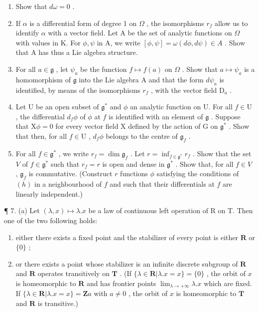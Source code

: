 \begin{enumerate}
\def\labelenumi{(\alph{enumi})}
\setcounter{enumi}{4}
\item
  Show that \(d\omega = 0\) .
\item
  If \(\alpha\) is a differential form of degree 1 on \(\Omega\) , the isomorphisms \(r_f\) allow us to identify \(\alpha\) with a vector field. Let A be the set of analytic functions on \(\Omega\) with values in K. For \(\phi, \psi\) in A, we write \([\phi, \psi] = \omega(d\phi, d\psi) \in A\) . Show that A has thus a Lie algebra structure.
\item
  For all \(a \in \mathfrak{g}\) , let \(\psi_{a}\) be the function \(f \mapsto f(a)\) on \(\Omega\) . Show that \(a \mapsto \psi_{a}\) is a homomorphism of \(\mathfrak{g}\) into the Lie algebra A and that the form \(d\psi_{a}\) is identified, by means of the isomorphisms \(r_{f}\) , with the vector field \(\mathrm{D}_{a}\) .
\item
  Let U be an open subset of \(\mathfrak{g}^*\) and \(\phi\) an analytic function on U. For all \(f\in \mathrm{U}\) , the differential \(d_{f}\phi\) of \(\phi\) at \(f\) is identified with an element of \(\mathfrak{g}\) . Suppose that \(\mathrm{X}\phi = 0\) for every vector field X defined by the action of G on \(\mathfrak{g}^*\) . Show that then, for all \(f\in \mathrm{U}\) , \(d_{f}\phi\) belongs to the centre of \(\mathfrak{g}_f\) .
\item
  For all \(f \in \mathfrak{g}^*\) , we write \(r_f = \dim \mathfrak{g}_f\) . Let \(r = \inf_{f \in \mathfrak{g}^*} r_f\) . Show that the set \(V\) of \(f \in \mathfrak{g}^*\) such that \(r_f = r\) is open and dense in \(\mathfrak{g}^*\) . Show that, for all \(f \in V\) , \(\mathfrak{g}_f\) is commutative. (Construct \(r\) functions \(\phi\) satisfying the conditions of \((h)\) in a neighbourhood of \(f\) and such that their differentials at \(f\) are linearly independent.)
\end{enumerate}

¶ 7. (a) Let \((\lambda, x) \mapsto \lambda.x\) be a law of continuous left operation of R on T. Then one of the two following holds:

\begin{enumerate}
\def\labelenumi{(\arabic{enumi})}
\item
  either there exists a fixed point and the stabilizer of every point is either \(\mathbf{R}\) or \(\{0\}\) ;
\item
  or there exists a point whose stabilizer is an infinite discrete subgroup of \(\mathbf{R}\) and \(\mathbf{R}\) operates transitively on \(\mathbf{T}\) . (If \(\{\lambda \in \mathbf{R}|\lambda .x = x\} = \{0\}\) , the orbit of \(x\) is homeomorphic to \(\mathbf{R}\) and has frontier points \(\lim_{\lambda \to +\infty}\lambda .x\) which are fixed. If \(\{\lambda \in \mathbf{R}|\lambda .x = x\} = \mathbf{Z}a\) with \(a\neq 0\) , the orbit of \(x\) is homeomorphic to \(\mathbf{T}\) and \(\mathbf{R}\) is transitive.)
\end{enumerate}

